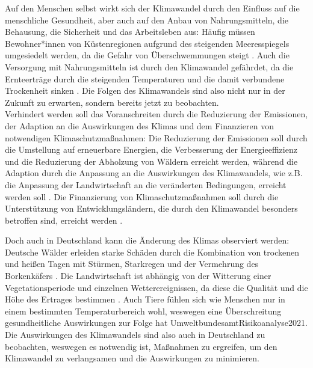 Auf den Menschen selbst wirkt sich der Klimawandel durch den Einfluss auf die menschliche Gesundheit, aber auch auf den Anbau von Nahrungsmitteln, die Behausung, die Sicherheit und das Arbeitsleben aus: Häufig müssen Bewohner*innen von Küstenregionen aufgrund des steigenden Meeresspiegels umgesiedelt werden, da die Gefahr von Überschwemmungen steigt \cite{UnitedNationsClimateChange}. Auch die Versorgung mit Nahrungsmitteln ist durch den Klimawandel gefährdet, da die Ernteerträge durch die steigenden Temperaturen und die damit verbundene Trockenheit sinken \cite{UnitedNationsClimateChange}. Die Folgen des Klimawandels sind also nicht nur in der Zukunft zu erwarten, sondern bereits jetzt zu beobachten. \\ Verhindert werden soll das Voranschreiten durch die Reduzierung der Emissionen, der Adaption an die Auswirkungen des Klimas und dem Finanzieren von notwendigen Klimaschutzmaßnahmen: Die Reduzierung der Emissionen soll durch die Umstellung auf erneuerbare Energien, die Verbesserung der Energieeffizienz und die Reduzierung der Abholzung von Wäldern erreicht werden, während die Adaption durch die Anpassung an die Auswirkungen des Klimawandels, wie z.B. die Anpassung der Landwirtschaft an die veränderten Bedingungen, erreicht werden soll \cite{UnitedNationsClimateChange}. Die Finanzierung von Klimaschutzmaßnahmen soll durch die Unterstützung von Entwicklungsländern, die durch den Klimawandel besonders betroffen sind, erreicht werden \cite{UnitedNationsClimateChange}.

Doch auch in Deutschland kann die Änderung des Klimas observiert werden: Deutsche Wälder erleiden starke Schäden durch die Kombination von trockenen und heißen Tagen mit Stürmen, Starkregen und der Vermehrung des Borkenkäfers \cite{UmweltbundesamtRisikoanalyse2021}. Die Landwirtschaft ist abhängig von der Witterung einer Vegetationsperiode und einzelnen Wetterereignissen, da diese die Qualität und die Höhe des Ertrages bestimmen \cite{UmweltbundesamtRisikoanalyse2021}. Auch Tiere fühlen sich wie Menschen nur in einem bestimmten Temperaturbereich wohl, weswegen eine Überschreitung gesundheitliche Auswirkungen zur Folge hat {UmweltbundesamtRisikoanalyse2021}. Die Auswirkungen des Klimawandels sind also auch in Deutschland zu beobachten, weswegen es notwendig ist, Maßnahmen zu ergreifen, um den Klimawandel zu verlangsamen und die Auswirkungen zu minimieren.

